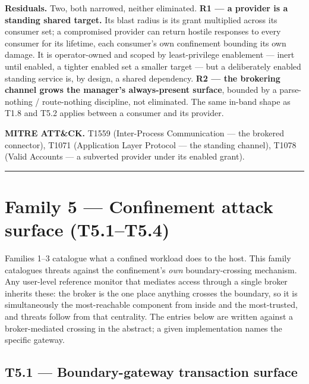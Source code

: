 \textbf{Residuals.} Two, both narrowed, neither eliminated. \textbf{R1
--- a provider is a standing shared target.} Its blast radius is its
grant multiplied across its consumer set; a compromised provider can
return hostile responses to every consumer for its lifetime, each
consumer's own confinement bounding its own damage. It is operator-owned
and scoped by least-privilege enablement --- inert until enabled, a
tighter enabled set a smaller target --- but a deliberately enabled
standing service is, by design, a shared dependency. \textbf{R2 --- the
brokering channel grows the manager's always-present surface}, bounded
by a parse-nothing / route-nothing discipline, not eliminated. The same
in-band shape as T1.8 and T5.2 applies between a consumer and its
provider.

\textbf{MITRE ATT\&CK.} T1559 (Inter-Process Communication --- the
brokered connector), T1071 (Application Layer Protocol --- the standing
channel), T1078 (Valid Accounts --- a subverted provider under its
enabled grant).

\begin{center}\rule{0.5\linewidth}{0.5pt}\end{center}

\hypertarget{family-5-confinement-attack-surface-t5.1t5.4}{%
\chapter{Family 5 --- Confinement attack surface
(T5.1--T5.4)}\label{family-5-confinement-attack-surface-t5.1t5.4}}

Families 1--3 catalogue what a confined workload does to the host. This
family catalogues threats against the confinement's \emph{own}
boundary-crossing mechanism. Any user-level reference monitor that
mediates access through a single broker inherits these: the broker is
the one place anything crosses the boundary, so it is simultaneously the
most-reachable component from inside and the most-trusted, and threats
follow from that centrality. The entries below are written against a
broker-mediated crossing in the abstract; a given implementation names
the specific gateway.

\hypertarget{t5.1-boundary-gateway-transaction-surface}{%
\section{T5.1 --- Boundary-gateway transaction
surface}\label{t5.1-boundary-gateway-transaction-surface}}

